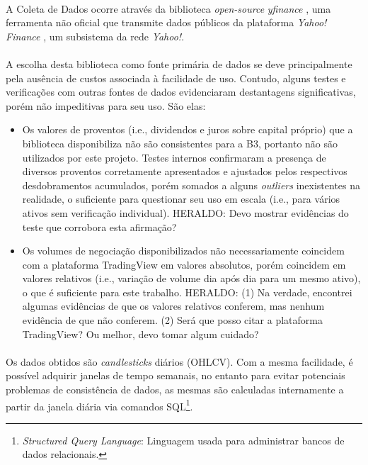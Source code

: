 \paragraph{} A Coleta de Dados ocorre através da biblioteca \textit{open-source} \textit{yfinance} \cite{yfinance}, uma ferramenta não oficial que transmite dados públicos da plataforma \textit{Yahoo! Finance} \cite{yahoo_finance}, um subsistema da rede \textit{Yahoo!}.

\paragraph{} A escolha desta biblioteca como fonte primária de dados se deve principalmente pela ausência de custos associada à facilidade de uso. Contudo, alguns testes e verificações com outras fontes de dados evidenciaram destantagens significativas, porém não impeditivas para seu uso. São elas:

\begin{itemize}
    \item Os valores de proventos (i.e., dividendos e juros sobre capital próprio) que a biblioteca disponibiliza não são consistentes para a B3, portanto não são utilizados por este projeto. Testes internos confirmaram a presença de diversos proventos corretamente apresentados e ajustados pelos respectivos desdobramentos acumulados, porém somados a alguns \textit{outliers} inexistentes na realidade, o suficiente para questionar seu uso em escala (i.e., para vários ativos sem verificação individual). \color{red} HERALDO: Devo mostrar evidências do teste que corrobora esta afirmação? 

    \item Os volumes de negociação disponibilizados não necessariamente coincidem com a plataforma TradingView em valores absolutos, porém coincidem em valores relativos (i.e., variação de volume dia após dia para um mesmo ativo), o que é suficiente para este trabalho. \color{red} HERALDO: (1) Na verdade, encontrei algumas evidências de que os valores relativos conferem, mas nenhum evidência de que não conferem. (2) Será que posso citar a plataforma TradingView? Ou melhor, devo tomar algum cuidado? 
\end{itemize}

\paragraph{} Os dados obtidos são \textit{candlesticks} diários (OHLCV). Com a mesma facilidade, é possível adquirir janelas de tempo semanais, no entanto para evitar potenciais problemas de consistência de dados, as mesmas são calculadas internamente a partir da janela diária via comandos SQL\footnote{\textit{Structured Query Language}: Linguagem usada para administrar bancos de dados relacionais.}.




